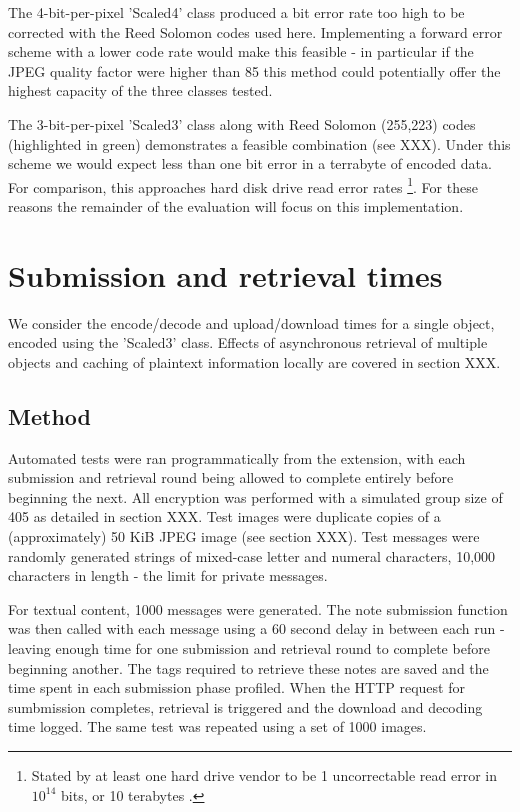The 4-bit-per-pixel 'Scaled4' class produced a bit error rate too high to be corrected with the Reed Solomon codes used here. Implementing a forward error scheme with a lower code rate would make this feasible - in particular if the JPEG quality factor were higher than 85 this method could potentially offer the highest capacity of the three classes tested.

The 3-bit-per-pixel 'Scaled3' class along with Reed Solomon (255,223) codes (highlighted in green) demonstrates a feasible combination (see XXX). Under this scheme we would expect less than one bit error in a terrabyte of encoded data. For comparison, this approaches hard disk drive read error rates \footnote{Stated by at least one hard drive vendor to be 1 uncorrectable read error in $10^{14}$ bits, or 10 terabytes \cite{hdd-errors}.}. For these reasons the remainder of the evaluation will focus on this implementation.



\section{Submission and retrieval times}

We consider the encode/decode and upload/download times for a single object, encoded using the 'Scaled3' class. Effects of asynchronous retrieval of multiple objects and caching of plaintext information locally are covered in section XXX.  


\subsection{Method}

Automated tests were ran programmatically from the extension, with each submission and retrieval round being allowed to complete entirely before beginning the next. All encryption was performed with a simulated group size of 405 as detailed in section XXX. Test images were duplicate copies of a (approximately) 50 KiB JPEG image (see section XXX). Test messages were randomly generated strings of mixed-case letter and numeral characters, 10,000 characters in length - the limit for private messages.

For textual content, 1000 messages were generated. The note submission function was then called with each message using a 60 second delay in between each run - leaving enough time for one submission and retrieval round to complete before beginning another. The tags required to retrieve these notes are saved and the time spent in each submission phase profiled. When the HTTP request for sumbmission completes, retrieval is triggered and the download and decoding time logged. The same test was repeated using a set of 1000 images.

